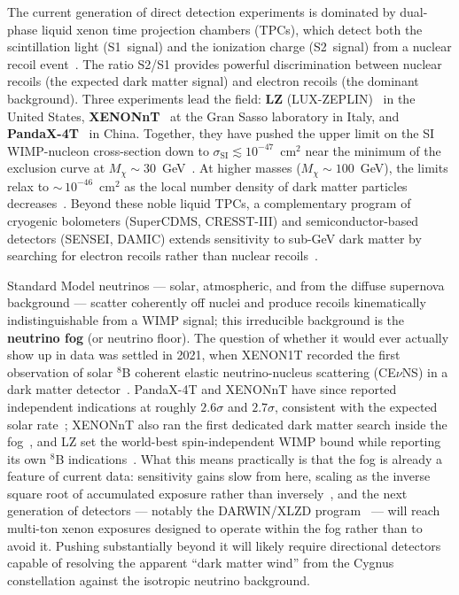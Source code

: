 The current generation of direct detection experiments is dominated by dual-phase liquid xenon time projection chambers (TPCs), which detect both the scintillation light (S1~signal) and the ionization charge (S2~signal) from a nuclear recoil event~\cite{Cirelli:2024ssz}.
The ratio S2/S1 provides powerful discrimination between nuclear recoils (the expected dark matter signal) and electron recoils (the dominant background).
Three experiments lead the field: \textbf{LZ} (LUX-ZEPLIN)~\cite{LZ:2022lsv} in the United States, \textbf{XENONnT}~\cite{XENON:2023cxc} at the Gran Sasso laboratory in Italy, and \textbf{PandaX-4T}~\cite{PandaX-4T:2021bab} in China.
Together, they have pushed the upper limit on the SI WIMP-nucleon cross-section down to $\sigma_\text{SI} \lesssim 10^{-47}$~cm$^2$ near the minimum of the exclusion curve at $M_\chi \sim 30$~GeV~\cite{LZ:2022lsv,XENON:2023cxc,PandaX-4T:2021bab}.
At higher masses ($M_\chi \sim 100$~GeV), the limits relax to ${\sim}\,10^{-46}$~cm$^2$ as the local number density of dark matter particles decreases~\cite{LZ:2024zvo}.
Beyond these noble liquid TPCs, a complementary program of cryogenic bolometers (SuperCDMS, CRESST-III) and semiconductor-based detectors (SENSEI, DAMIC) extends sensitivity to sub-GeV dark matter by searching for electron recoils rather than nuclear recoils~\cite{Cirelli:2024ssz}.

Standard Model neutrinos --- solar, atmospheric, and from the diffuse supernova background --- scatter coherently off nuclei and produce recoils kinematically indistinguishable from a WIMP signal; this irreducible background is the \textbf{neutrino fog} (or neutrino floor).
The question of whether it would ever actually show up in data was settled in 2021, when XENON1T recorded the first observation of solar $^8$B coherent elastic neutrino-nucleus scattering (CE$\nu$NS) in a dark matter detector~\cite{XENON:2020gfr}.
PandaX-4T and XENONnT have since reported independent indications at roughly $2.6\sigma$ and $2.7\sigma$, consistent with the expected solar rate~\cite{PandaX:2024muv,XENON:2024hup}; XENONnT also ran the first dedicated dark matter search inside the fog~\cite{XENON:2024hup}, and LZ set the world-best spin-independent WIMP bound while reporting its own $^8$B indications~\cite{LZ:2024zvo}.
What this means practically is that the fog is already a feature of current data: sensitivity gains slow from here, scaling as the inverse square root of accumulated exposure rather than inversely~\cite{OHare:2021utq}, and the next generation of detectors --- notably the DARWIN/XLZD program~\cite{DARWIN:2016hyl} --- will reach multi-ton xenon exposures designed to operate within the fog rather than to avoid it.
Pushing substantially beyond it will likely require directional detectors capable of resolving the apparent ``dark matter wind'' from the Cygnus constellation against the isotropic neutrino background.

